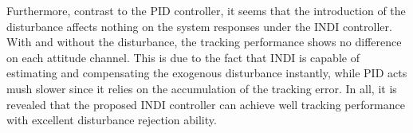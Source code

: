	Furthermore, contrast to the PID controller, it seems that the introduction of the disturbance affects nothing on the system responses under the INDI controller. With and without the disturbance, the tracking performance shows no difference on each attitude channel. This is due to the fact that INDI is capable of estimating and compensating the exogenous disturbance instantly, while PID acts mush slower since it relies on the accumulation of the tracking error. In all, it is revealed that the proposed INDI controller can achieve well tracking performance with excellent disturbance rejection ability.
	\begin{figure}
		\centering
		\hfil   %
		\hfil
\end{figure}
